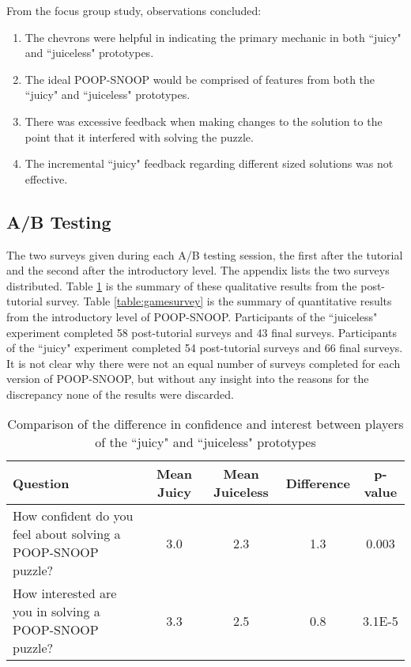 From the focus group study, observations concluded: 

\begin{enumerate}

\item The chevrons were helpful in indicating the primary mechanic in both ``juicy" and ``juiceless" prototypes.

\item The ideal POOP-SNOOP would be comprised of features from both the ``juicy" and ``juiceless" prototypes.

\item There was excessive feedback when making changes to the solution to the point that it interfered with solving the puzzle.

\item The incremental ``juicy" feedback regarding different sized solutions was not effective.

\end{enumerate}

\subsection{A/B Testing}

The two surveys given during each A/B testing session, the first after the tutorial and the second after the introductory level. The appendix lists the two surveys distributed. Table \ref{table:tutorialsurvey} is the summary of these qualitative results from the post-tutorial survey. Table \ref{table:gamesurvey} is the summary of quantitative results from the introductory level of POOP-SNOOP. Participants of the ``juiceless" experiment completed 58 post-tutorial surveys and 43 final surveys. Participants of the ``juicy" experiment completed 54 post-tutorial surveys and 66 final surveys. It is not clear why there were not an equal number of surveys completed for each version of POOP-SNOOP, but without any insight into the reasons for the discrepancy none of the results were discarded.


\begin{table}
\begin{center}

\begin{tabular}{|>{\centering}p{3cm}|c|c|c||c|}
\hline 
Question&  Mean Juicy&  Mean Juiceless&  Difference&  p-value
\tabularnewline
\hline 
How confident do you feel about solving a POOP-SNOOP puzzle?&  3.0&  2.3&  1.3&  0.003
\tabularnewline
\hline 
How interested are you in solving a POOP-SNOOP puzzle?&  3.3&  2.5&  0.8&  3.1E-5 
\tabularnewline
\hline 
\end{tabular}

\caption{Comparison of the difference in confidence and interest between players of the ``juicy" and ``juiceless" prototypes}
\label{table:tutorialsurvey}
\end{center}
\end{table}

